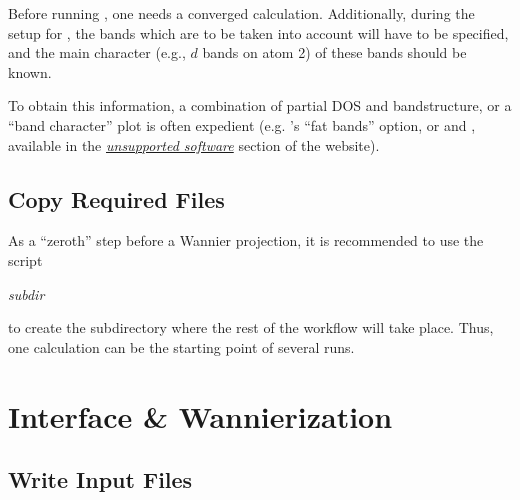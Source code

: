 Before running \wtow, one needs a converged \wien calculation.
Additionally, during the setup for \wtow, the bands which are to be
taken into account will have to be specified, and the main character
(e.g., $d$ bands on atom 2) of these bands should be known.

To obtain this information, a combination of partial DOS and
bandstructure, or a ``band character'' plot is often expedient
(e.g. 's ``fat bands'' option, or
\href{http://www.cpfs.mpg.de/haverkort/spaghetti_primavera}{}
and \href{https://eassmann.github.io/prima.py}{},
available in the
\href{http://www.wien2k.at/reg_user/unsupported/}{\textit{unsupported
    software}} section of the \wien website).


\subsection{Copy Required Files}

As a ``zeroth'' step before a Wannier projection, it is recommended to
use the script
\begin{usage}
  \prepwiiw \textit{subdir}
\end{usage}
to create the subdirectory  where the rest of
the workflow will take place. Thus, one \wien calculation can be the
starting point of several \wtow runs.


\section{Interface \& Wannierization}
\label{sec:quitckstart_main}

\subsection{Write Input Files}
\label{sec:init}

